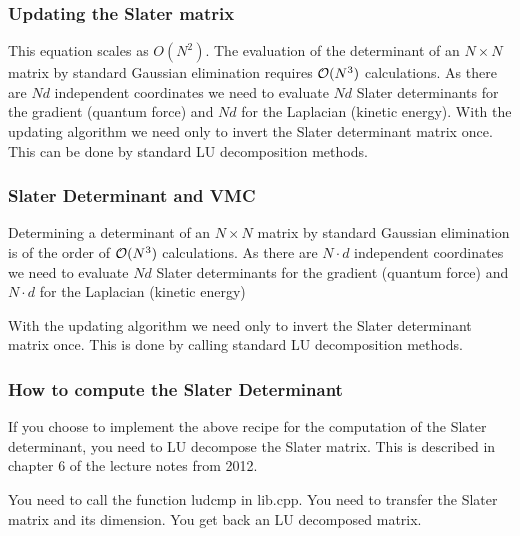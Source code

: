\frame
{
  \frametitle{Updating the Slater matrix}
\begin{small}
{\scriptsize
This equation scales as $O(N^2)$.
The evaluation of the determinant of an $N \times N$ matrix by standard Gaussian elimination requires ${\cal O}(N^3)$
calculations. 
As there are $Nd$ independent coordinates we need to evaluate $Nd$ Slater determinants 
for the gradient (quantum force) and $Nd$ for the Laplacian (kinetic energy). 
With the updating algorithm we need only to invert the Slater 
determinant matrix once. This can be done by standard LU decomposition methods.\\

}
\end{small}
}





\frame
{
  \frametitle{Slater Determinant and  VMC}
\begin{small}
{\scriptsize

Determining a determinant of an $N \times N$ matrix by
standard Gaussian elimination is of the order of ${\cal O}(N^3)$
calculations. As there are $N\cdot d$ independent coordinates we need
to evaluate $Nd$ Slater determinants for the gradient (quantum force) and
$N\cdot d$ for the Laplacian (kinetic energy)

With the updating algorithm we need only to invert the Slater determinant matrix once.
This is done by calling standard LU decomposition methods.
}
\end{small}
}





\frame
{
  \frametitle{How to compute the Slater Determinant}
\begin{small}
{\scriptsize
If you choose to implement the above recipe for the computation of the Slater determinant,
you need to LU decompose the Slater matrix. This is described in chapter 6 of the lecture notes from 2012.

You need to call the function ludcmp in lib.cpp.
You need to transfer the Slater matrix and its dimension. You get back an LU decomposed matrix.
}
\end{small}
}

